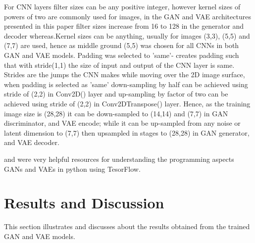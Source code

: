 \documentclass{article}
\begin{document}
	For CNN layers filter sizes can be any positive integer, however kernel sizes of powers of two are commonly used for images, in the GAN and VAE architectures presented in this paper filter sizes increase from 16 to 128 in the generator and decoder whereas.Kernel sizes can be anything, usually for images (3,3), (5,5) and (7,7) are used, hence as middle ground (5,5) was chosen for all CNNs in both GAN and VAE models. Padding was selected to 'same'- creates padding such that with stride(1,1) the size of input and output of the CNN layer is same. Strides are the jumps the CNN makes while moving over the 2D image surface, when padding is selected as 'same' down-sampling by half can be achieved using stride of (2,2) in Conv2D() layer and up-sampling by factor of two can be achieved using stride of (2,2) in Conv2DTranspose() layer. Hence, as the training image size is (28,28) it can be down-sampled to (14,14) and (7,7) in GAN discriminator, and VAE encode; while it can be up-sampled from any noise or latent dimension to (7,7) then upsampled in stages to (28,28) in GAN generator, and VAE decoder.
	
	\cite{TensorFlowCNNVAE:online} and \cite{TensorflowCNNVAE:online} were very helpful resources for understanding the programming aspects GANs and VAEs in python using TesorFlow.
	
	
	\section{Results and Discussion}\label{section:ResultsDiscussion}
	
	This section illustrates and discusses about the results obtained from the trained GAN and VAE models.
	
\end{document}

